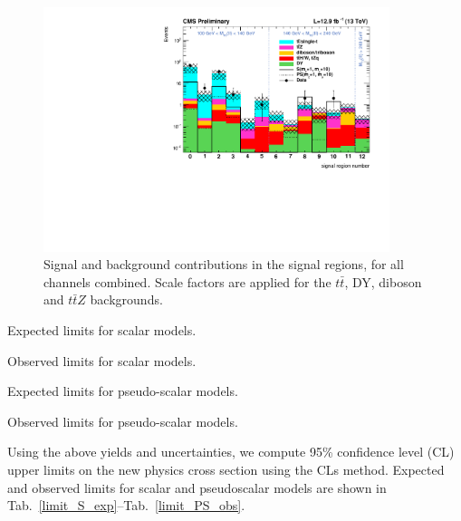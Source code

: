   \begin{figure}
    \centering
    \includegraphics[width=0.9\textwidth]{figures/regions80X/DY-DD/TTZ-DD-Top16009/TTJets-DD/multiBoson-DD/all_bkgs.pdf}
    \caption{Signal and background contributions in the signal regions, for all channels combined. Scale factors are applied for the $t\bar{t}$, DY, diboson and $t\bar{t}Z$ backgrounds.}
    \label{fig:signalRegions-all}
  \end{figure}

  \begin{table}[ht]
  \begin{center}
  \caption{Expected limits for scalar models.}\label{limit_S_exp}
  
  \end{center}
  \end{table}

  \begin{table}[ht]
  \begin{center}
  \caption{Observed limits for scalar models.}\label{limit_S_obs}
  
  \end{center}
  \end{table}

  \newpage
  \begin{table}[ht]
  \begin{center}
  \caption{Expected limits for pseudo-scalar models.}\label{limit_PS_exp}
  
  \end{center}
  \end{table}

  \begin{table}[ht]
  \begin{center}
  \caption{Observed limits for pseudo-scalar models.}\label{limit_PS_obs}
  
  \end{center}
  \end{table}

  Using the above yields and uncertainties, we compute 95\% confidence level (CL) upper limits on the new physics cross section using the CLs method.
  Expected and observed limits for scalar and pseudoscalar models are shown in Tab.~\ref{limit_S_exp}--Tab.~\ref{limit_PS_obs}.

